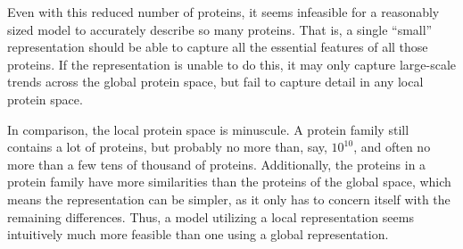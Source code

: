 Even with this reduced number of proteins, it seems infeasible for a reasonably sized model to accurately describe so many proteins. That is, a single ``small'' representation should be able to capture all the essential features of all those proteins. If the representation is unable to do this, it may only capture large-scale trends across the global protein space, but fail to capture detail in any local protein space.

In comparison, the local protein space is minuscule. A protein family still contains a lot of proteins, but probably no more than, say, $10^{10}$, and often no more than a few tens of thousand of proteins. Additionally, the proteins in a protein family have more similarities than the proteins of the global space, which means the representation can be simpler, as it only has to concern itself with the remaining differences. Thus, a model utilizing a local representation seems intuitively much more feasible than one using a global representation.


